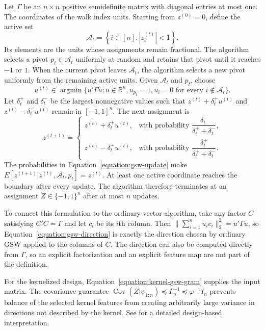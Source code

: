 \documentclass[letterpaper,12pt]{article}
\theoremstyle{definition}
\numberwithin{equation}{section}
\newcommand{\norm}[1]{\lVert#1\rVert}
\DeclareMathOperator{\cov}{Cov}
\DeclareMathOperator*{\argmin}{argmin}
\begin{document}
Let $\Gamma$ be an $n\times n$ positive semidefinite matrix with diagonal entries at most one.
The coordinates of the walk index units.
Starting from $z^{(0)}=0$, define the active set
\begin{equation}\label{equation:gsw-active-set}
\mathcal A_t = \left\{ i\in[n]:|z_i^{(t)}|<1 \right\}.
\end{equation}
Its elements are the units whose assignments remain fractional.
The algorithm selects a pivot $p_t\in\mathcal A_t$ uniformly at random and retains that pivot until it reaches $-1$ or $1$.
When the current pivot leaves $\mathcal A_t$, the algorithm selects a new pivot uniformly from the remaining active units.
Given $\mathcal A_t$ and $p_t$, choose
\begin{equation}\label{equation:gsw-direction}
u^{(t)} \in \argmin\bigl\{u'\Gamma u:u\in\mathbb R^n, u_{p_t}=1, u_i=0\text{ for every }i\notin\mathcal A_t\bigr\}.
\end{equation}
Let $\delta_t^+$ and $\delta_t^-$ be the largest nonnegative values such that $z^{(t)}+\delta_t^+u^{(t)}$ and $z^{(t)}-\delta_t^-u^{(t)}$ remain in $[-1,1]^n$.
The next assignment is
\begin{equation}\label{equation:gsw-update}
z^{(t+1)} = \begin{cases}
z^{(t)}+\delta_t^+u^{(t)}, & \text{with probability } \dfrac{\delta_t^-}{\delta_t^++\delta_t^-},\\
z^{(t)}-\delta_t^-u^{(t)}, & \text{with probability } \dfrac{\delta_t^+}{\delta_t^++\delta_t^-}.
\end{cases}
\end{equation}
The probabilities in Equation~\eqref{equation:gsw-update} make $E[z^{(t+1)}|z^{(t)},\mathcal A_t,p_t]=z^{(t)}$.
At least one active coordinate reaches the boundary after every update.
The algorithm therefore terminates at an assignment $Z\in\{-1,1\}^n$ after at most $n$ updates.

To connect this formulation to the ordinary vector algorithm, take any factor $C$ satisfying $C'C=\Gamma$ and let $c_i$ be its $i$th column.
Then $\norm{\sum_{i=1}^nu_ic_i}_2^2=u'\Gamma u$, so Equation~\eqref{equation:gsw-direction} is exactly the direction chosen by ordinary GSW applied to the columns of $C$.
The direction can also be computed directly from $\Gamma$, so an explicit factorization and an explicit feature map are not part of the definition.

For the kernelized design, Equation~\eqref{equation:kernel-gsw-gram} supplies the input matrix.
The covariance guarantee $\cov(Z|\psi_{1:n})\preceq\Gamma_n^{-1}\preceq\varphi^{-1}I_n$ prevents balance of the selected kernel features from creating arbitrarily large variance in directions not described by the kernel.
See \citet{harshaw2024gsw} for a detailed design-based interpretation.
\end{document}
